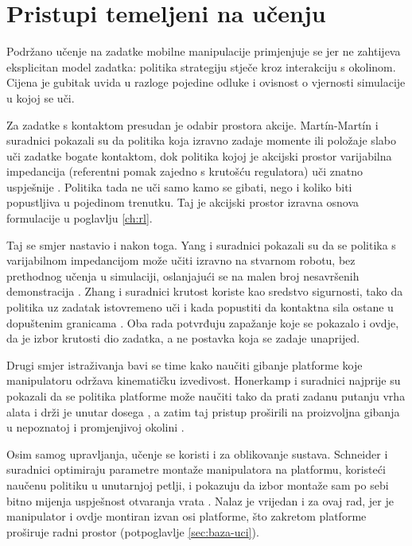 \section{Pristupi temeljeni na učenju}
\label{sec:pregled-rl}

Podržano učenje na zadatke mobilne manipulacije primjenjuje se jer ne zahtijeva eksplicitan model
zadatka: politika strategiju stječe kroz interakciju s okolinom. Cijena je gubitak uvida u
razloge pojedine odluke i ovisnost o vjernosti simulacije u kojoj se uči.

Za zadatke s kontaktom presudan je odabir prostora akcije. Martín-Martín i suradnici pokazali su
da politika koja izravno zadaje momente ili položaje slabo uči zadatke bogate kontaktom, dok
politika kojoj je akcijski prostor varijabilna impedancija (referentni pomak
zajedno s krutošću regulatora) uči znatno uspješnije \cite{martinmartin2019variable}. Politika
tada ne uči samo kamo se gibati, nego i koliko biti popustljiva u pojedinom trenutku. Taj je
akcijski prostor izravna osnova formulacije u poglavlju \ref{ch:rl}.

Taj se smjer nastavio i nakon toga. Yang i suradnici pokazali su da se politika s varijabilnom
impedancijom može učiti izravno na stvarnom robotu, bez prethodnog učenja u simulaciji, oslanjajući
se na malen broj nesavršenih demonstracija \cite{yang2022variable}. Zhang i suradnici krutost
koriste kao sredstvo sigurnosti, tako da politika uz zadatak istovremeno uči i kada popustiti da
kontaktna sila ostane u dopuštenim granicama \cite{zhang2024srlvic}. Oba rada potvrđuju
zapažanje koje se pokazalo i ovdje, da je izbor krutosti dio zadatka, a ne postavka koja se zadaje
unaprijed.

Drugi smjer istraživanja bavi se time kako naučiti gibanje platforme koje manipulatoru održava
kinematičku izvedivost. Honerkamp i suradnici najprije su pokazali da se politika platforme može
naučiti tako da prati zadanu putanju vrha alata i drži je unutar dosega
\cite{honerkamp2021feasibility}, a zatim taj pristup proširili na proizvoljna gibanja u
nepoznatoj i promjenjivoj okolini \cite{honerkamp2023n2m2}.

Osim samog upravljanja, učenje se koristi i za oblikovanje sustava. Schneider i suradnici
optimiraju parametre montaže manipulatora na platformu, koristeći naučenu politiku u unutarnjoj
petlji, i pokazuju da izbor montaže sam po sebi bitno mijenja uspješnost otvaranja vrata
\cite{schneider2024codesign}. Nalaz je vrijedan i za ovaj rad, jer je manipulator i ovdje
montiran izvan osi platforme, što zakretom platforme proširuje radni prostor (potpoglavlje
\ref{sec:baza-uci}).


